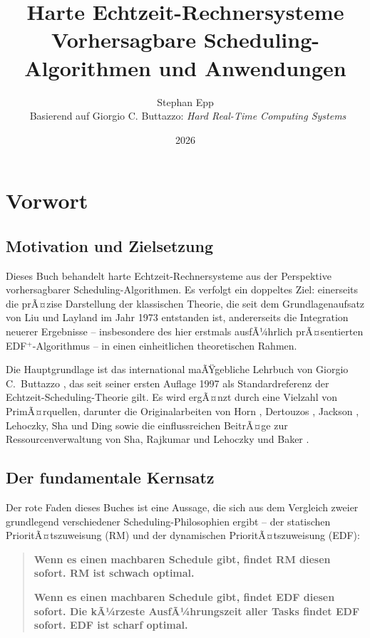 ﻿\documentclass[a4paper,12pt]{report}
\title{%
	\textbf{Harte Echtzeit-Rechnersysteme}\\[0.5em]
	\large Vorhersagbare Scheduling-Algorithmen und Anwendungen
}
\author{Stephan Epp\\
	\
	\small Basierend auf Giorgio C. Buttazzo: \textit{Hard Real-Time Computing Systems}}
\date{2026}
\theoremstyle{definition}
\begin{document}
\maketitle

\tableofcontents
\newpage

\chapter*{Vorwort}

\section*{Motivation und Zielsetzung}

Dieses Buch behandelt harte Echtzeit-Rechnersysteme aus der Perspektive
vorhersagbarer Scheduling-Algorithmen. Es verfolgt ein doppeltes Ziel:
einerseits die prÃ¤zise Darstellung der klassischen Theorie, die seit dem
Grundlagenaufsatz von Liu und Layland \cite{Liu1973} im Jahr 1973 entstanden
ist, andererseits die Integration neuerer Ergebnisse -- insbesondere des
hier erstmals ausfÃ¼hrlich prÃ¤sentierten EDF$^+$-Algorithmus \cite{Epp2026} --
in einen einheitlichen theoretischen Rahmen.

Die Hauptgrundlage ist das international maÃŸgebliche Lehrbuch von Giorgio C.\
Buttazzo \cite{Buttazzo2011}, das seit seiner ersten Auflage 1997 als
Standardreferenz der Echtzeit-Scheduling-Theorie gilt. Es wird ergÃ¤nzt durch
eine Vielzahl von PrimÃ¤rquellen, darunter die Originalarbeiten von Horn
\cite{Horn1974}, Dertouzos \cite{Dertouzos1974}, Jackson \cite{Jackson1955},
Lehoczky, Sha und Ding \cite{Lehoczky1989} sowie die einflussreichen BeitrÃ¤ge
zur Ressourcenverwaltung von Sha, Rajkumar und Lehoczky \cite{Sha1990} und
Baker \cite{Baker1991}.

\section*{Der fundamentale Kernsatz}

Der rote Faden dieses Buches ist eine Aussage, die sich aus dem Vergleich
zweier grundlegend verschiedener Scheduling-Philosophien ergibt -- der
statischen PrioritÃ¤tszuweisung (RM) und der dynamischen PrioritÃ¤tszuweisung
(EDF):

\begin{quote}
\textbf{Wenn es einen machbaren Schedule gibt, findet RM diesen sofort.
RM ist schwach optimal.}

\textbf{Wenn es einen machbaren Schedule gibt, findet EDF diesen sofort.
Die kÃ¼rzeste AusfÃ¼hrungszeit aller Tasks findet EDF sofort.
EDF ist scharf optimal.}
\end{quote}
\end{document}
